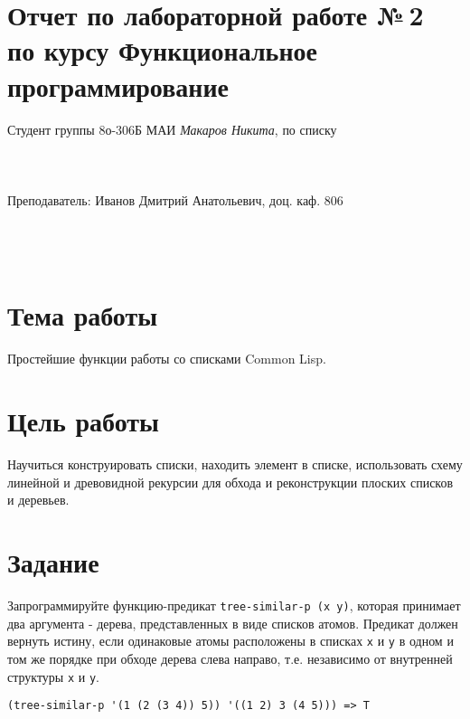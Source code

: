 \documentclass[a4paper, 12pt]{article}
\begin{document}
\section*{Отчет по лабораторной работе №\,2 
\\по курсу \guillemotleft  Функциональное программирование\guillemotright}

\begin{flushright}
Студент группы 8о-306Б МАИ \textit{Макаров Никита},  по списку \\
 \\
 \\
\ \\
Преподаватель: Иванов Дмитрий Анатольевич, доц. каф. 806 \\
 \\
 \\
 \\

\end{flushright}


\section{Тема работы}
Простейшие функции работы со списками Common Lisp.


\section{Цель работы}
Научиться конструировать списки, находить элемент в списке, использовать схему линейной и древовидной рекурсии для обхода и реконструкции плоских списков и деревьев.

\section{Задание}
Запрограммируйте функцию-предикат {\tt tree-similar-p (x y)}, которая принимает два аргумента - дерева, представленных в виде списков атомов. Предикат должен вернуть истину, если одинаковые атомы расположены в списках {\tt х} и {\tt у} в одном и том же порядке при обходе дерева слева направо, т.е. независимо от внутренней структуры {\tt х} и {\tt у}.

\begin{lstlisting}
(tree-similar-p '(1 (2 (3 4)) 5)) '((1 2) 3 (4 5))) => T
\end{lstlisting}
\end{document}
